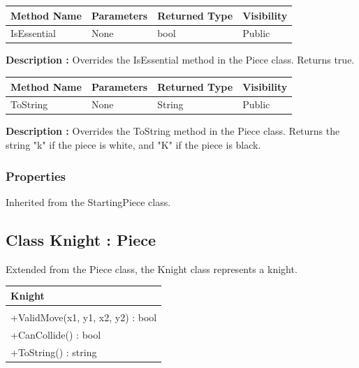\documentclass[12pt]{article}
\begin{document}
    \begin{table}[H]
        \begin{tabular}{|l|l|l|l|}
            \hline
            \rowcolor[HTML]{EFEFEF}
            \cellcolor[HTML]{EFEFEF}\textbf{Method Name} & \textbf{Parameters} & \textbf{Returned Type} & \textbf{Visibility} \\ \hline
            IsEssential                                  & None                & bool                   & Public              \\ \hline
        \end{tabular}
    \end{table}

    \textbf{Description :} Overrides the IsEssential method in the Piece class.
    Returns true.

    \begin{table}[H]
        \begin{tabular}{|l|l|l|l|}
            \hline
            \rowcolor[HTML]{EFEFEF}
            \cellcolor[HTML]{EFEFEF}\textbf{Method Name} & \textbf{Parameters} & \textbf{Returned Type} & \textbf{Visibility} \\ \hline
            ToString                                     & None                & String                 & Public              \\ \hline
        \end{tabular}
    \end{table}

    \textbf{Description :} Overrides the ToString method in the Piece class.
    Returns the string "k" if the piece is white, and "K" if the piece is black.

    \subsubsection{Properties}

    Inherited from the StartingPiece class.
    \newpage


    \subsection{Class Knight : Piece}

    Extended from the Piece class, the Knight class represents a knight.
    \begin{table}[H]
        \begin{tabular}{|l|}
            \hline
            \cellcolor[HTML]{C0C0C0}\textbf{Knight} \\ \hline
            \cellcolor[HTML]{EFEFEF}                \\ \hline
            +ValidMove(x1, y1, x2, y2) : bool       \\ \hline
            +CanCollide() : bool                    \\ \hline
            +ToString() : string                    \\ \hline
        \end{tabular}
    \end{table}
\end{document}
